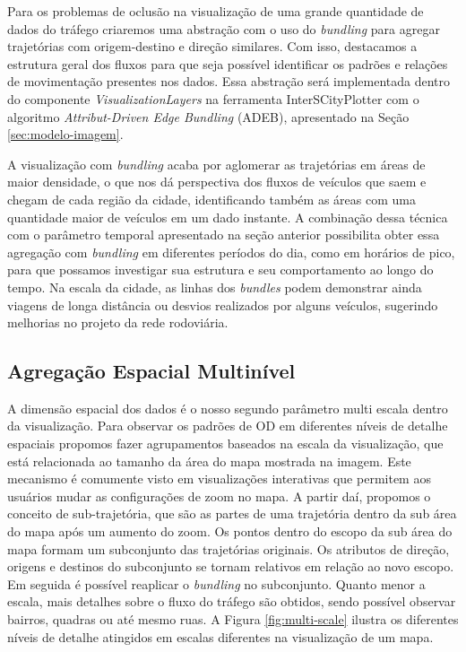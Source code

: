 Para os problemas de oclusão na visualização de uma grande quantidade de dados
do tráfego criaremos uma abstração com o uso do \emph{bundling} para agregar
trajetórias com origem-destino e direção similares. Com isso, destacamos a
estrutura geral dos fluxos para que seja possível identificar os padrões e
relações de movimentação presentes nos  dados. Essa abstração será implementada
dentro do componente \emph{VisualizationLayers} na ferramenta InterSCityPlotter
com o algoritmo \emph{Attribut-Driven Edge Bundling} (ADEB), apresentado na
Seção \ref{sec:modelo-imagem}.

 A visualização com \emph{bundling} acaba por aglomerar as trajetórias em áreas
de maior densidade, o que nos dá perspectiva dos fluxos de veículos que saem e
chegam de cada região da cidade, identificando também as áreas com uma
quantidade maior de veículos em um dado instante. A combinação dessa técnica
com o parâmetro temporal apresentado na seção anterior possibilita obter essa
agregação com \emph{bundling} em diferentes períodos do dia, como em horários
de pico, para que possamos investigar sua estrutura e seu comportamento ao
longo do tempo. Na escala da cidade, as linhas dos \emph{bundles} podem
demonstrar ainda viagens de longa distância ou desvios realizados por alguns
veículos, sugerindo melhorias no projeto da rede rodoviária.

\subsection{Agregação Espacial Multinível}

  A dimensão espacial dos dados é o nosso segundo parâmetro multi escala dentro
da visualização. Para observar os padrões de OD em diferentes níveis de detalhe
espaciais propomos fazer agrupamentos baseados na escala da visualização, que
está relacionada ao tamanho da área do mapa mostrada na imagem. Este mecanismo
é comumente visto em visualizações interativas que permitem aos usuários mudar
as configurações de zoom no mapa. A partir daí, propomos o conceito de
sub-trajetória, que são as partes de uma trajetória dentro da sub área do mapa
após um aumento do zoom. Os pontos dentro do escopo da sub área do mapa formam
um subconjunto das trajetórias originais. Os atributos de direção, origens e
destinos do subconjunto se tornam relativos em relação ao novo escopo. Em
seguida é possível reaplicar o \emph{bundling} no subconjunto. Quanto menor a
escala, mais detalhes sobre o fluxo do tráfego são obtidos, sendo possível
observar bairros, quadras ou até mesmo ruas. A Figura \ref{fig:multi-scale}
ilustra os diferentes níveis de detalhe atingidos em escalas diferentes na
visualização de um mapa.

